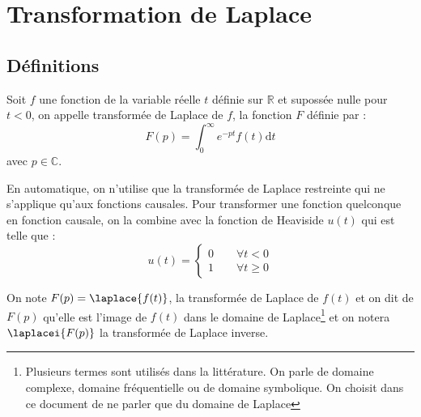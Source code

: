 \chapter{Transformation de Laplace\label{annexe-lap}}
\section{Définitions} 
Soit $f$ une fonction de la variable réelle $t$ définie sur $\mathbb{R}$ 
et supossée  nulle pour $t<0$, on appelle transformée de Laplace de $f$, 
la fonction $F$ définie par :
$$
F(p) = \int_0^\infty e^{-pt} f(t) \mathrm{d}t
$$
avec $p\in\mathbb{C}$. 

En automatique, on n'utilise que la transformée de Laplace restreinte qui 
ne s'applique qu'aux fonctions causales.
Pour transformer une fonction quelconque en fonction causale, 
on la combine avec la fonction de Heaviside $u(t)$ qui est telle que :
$$u(t)=\begin{cases}0\qquad\forall t<0\\1 \qquad\forall t\geq 0\end{cases} $$

On note $F(p)=\laplace{f(t)}$, la transformée de Laplace de $f(t)$ et on dit 
de $F(p)$ qu'elle est l'image de $f(t)$ dans le domaine de 
Laplace\footnote{Plusieurs termes sont utilisés dans la littérature. On parle 
de domaine complexe, domaine fréquentielle ou de domaine symbolique. On choisit 
dans ce document de ne parler que du domaine de Laplace} et on notera 
$\laplacei{F(p)}$ la transformée de Laplace inverse.
